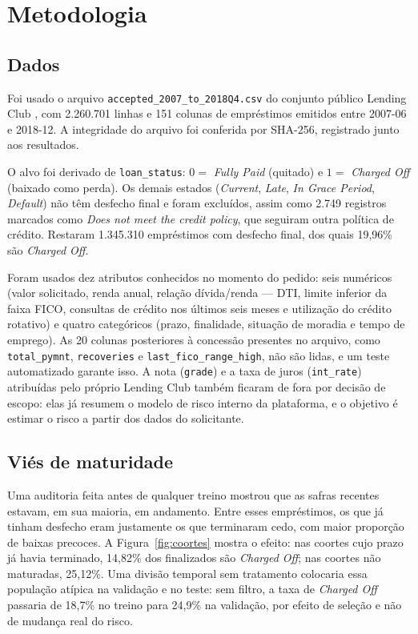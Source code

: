 \documentclass[12pt]{article}
\begin{document}
\section{Metodologia}\label{sec:metodologia}

\subsection{Dados}

Foi usado o arquivo \texttt{accepted\_2007\_to\_2018Q4.csv} do conjunto público
Lending Club \cite{lendingclubkaggle}, com 2.260.701 linhas e 151 colunas de
empréstimos emitidos entre 2007-06 e 2018-12. A integridade do arquivo foi
conferida por SHA-256, registrado junto aos resultados.

O alvo foi derivado de \texttt{loan\_status}: $0=$ \textit{Fully Paid}
(quitado) e $1=$ \textit{Charged Off} (baixado como perda). Os demais estados
(\textit{Current}, \textit{Late}, \textit{In Grace Period}, \textit{Default})
não têm desfecho final e foram excluídos, assim como 2.749 registros marcados
como \textit{Does not meet the credit policy}, que seguiram outra política de
crédito. Restaram 1.345.310 empréstimos com desfecho final, dos quais 19,96\%
são \textit{Charged Off}.

Foram usados dez atributos conhecidos no momento do pedido: seis numéricos
(valor solicitado, renda anual, relação dívida/renda --- DTI, limite inferior
da faixa FICO, consultas de crédito nos últimos seis meses e utilização do
crédito rotativo) e quatro categóricos (prazo, finalidade, situação de moradia e
tempo de emprego). As 20 colunas posteriores à concessão presentes no arquivo,
como \texttt{total\_pymnt}, \texttt{recoveries} e
\texttt{last\_fico\_range\_high}, não são lidas, e um teste automatizado garante
isso. A nota (\texttt{grade}) e a taxa de juros (\texttt{int\_rate}) atribuídas
pelo próprio Lending Club também ficaram de fora por decisão de escopo: elas já
resumem o modelo de risco interno da plataforma, e o objetivo é estimar o risco
a partir dos dados do solicitante.

\subsection{Viés de maturidade}\label{sec:maturidade}

Uma auditoria feita antes de qualquer treino mostrou que as safras recentes
estavam, em sua maioria, em andamento. Entre esses empréstimos, os que já tinham
desfecho eram justamente os que terminaram cedo, com maior proporção de baixas
precoces. A Figura~\ref{fig:coortes} mostra o efeito: nas coortes cujo prazo já
havia terminado, 14,82\% dos finalizados são \textit{Charged Off}; nas coortes
não maturadas, 25,12\%. Uma divisão temporal sem tratamento colocaria essa
população atípica na validação e no teste: sem filtro, a taxa de
\textit{Charged Off} passaria de 18,7\% no treino para 24,9\% na validação, por
efeito de seleção e não de mudança real do risco.
\end{document}
